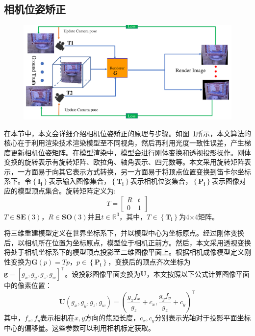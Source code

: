 \subsection{相机位姿矫正}
\begin{figure}[ht]
    \centering
    \includegraphics[width=1\columnwidth]{pic/work1/cameras.pdf}
    \label{fig:cameras}
\end{figure}

在本节中，本文会详细介绍相机位姿矫正的原理与步骤。如图~\ref{fig:cameras}所示，本文算法的核心在于利用渲染技术渲染模型至不同视角，然后再利用光度一致性误差，产生梯度更新相机位姿矩阵。在模型渲染中，模型会进行刚体变换和透视投影操作。刚体变换的旋转表示有旋转矩阵、欧拉角、轴角表示、四元数等。本文采用旋转矩阵表示，一方面易于向其它表示方式转换，另一方面易于将顶点位置变换到笛卡尔坐标系下。令$ \left \{ \mathbf{I_i} \right \} $表示输入图像集合，$\left \{ \mathbf{T_i} \right \}$表示相机位姿集合，$\left \{ \mathbf{P_i} \right \}$表示图像对应的模型顶点集合。旋转矩阵定义为:
\begin{equation}
	T = \left[\begin{array}{cc}
		R & t \\
		0 & 1
	\end{array}\right]
\end{equation}
$T \in \mathbf{SE}(3)$，$R \in \mathbf{SO}(3)$并且$t\in\mathbb{R}^3$，其中，$T \in \left \{ \mathbf{T_i} \right \}$为4$\times$4矩阵。\par 
将三维重建模型定义在世界坐标系下，并以模型中心为坐标原点。经过刚体变换后，以相机所在位置为坐标原点，模型位于相机正前方。然后，本文采用透视变换将处于相机坐标系下的模型顶点投影至二维图像平面上。根据相机成像模型定义刚性变换为$\mathbf{G}(p)=Tp$，$p \in \left \{ \mathbf{P_i} \right \}$，变换后的顶点齐次坐标为$\mathbf{g}=[g_x, g_y, g_z,g_w]^\top$。设投影图像平面变换为$\mathbf{U}$，本文按照以下公式计算图像平面中的像素位置：
\begin{equation}
\mathbf{U}\left(g_{x}, g_{y}, g_{z}, g_{w}\right)=\left(\frac{g_{x} f_{x}}{g_{z}}+c_{x}, \frac{g_{y} f_{y}}{g_{z}}+c_{y}\right)^{\top} \label{project}
\end{equation}
其中，$f_x,f_y$表示相机在$x,y$方向的焦距长度，$c_x,c_y$分别表示光轴对于投影平面坐标中心的偏移量。这些参数可以利用相机标定获取。\par


